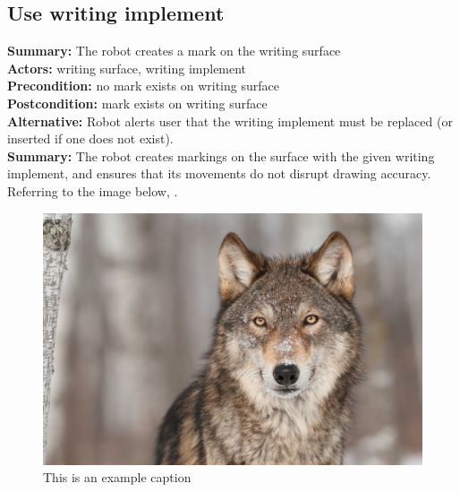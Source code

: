 \subsection{Use writing implement}
\textbf{Summary:} The robot creates a mark on the writing surface \\
\textbf{Actors:} writing surface, writing implement \\
\textbf{Precondition:} no mark exists on writing surface \\
\textbf{Postcondition:} mark exists on writing surface \\
\textbf{Alternative:} Robot alerts user that the writing implement must be replaced (or inserted if one does not exist). \\
\textbf{Summary:} The robot creates markings on the surface with the given writing implement, and ensures that its movements do not disrupt drawing accuracy. \\

Referring to the image below, .


\begin{figure}
 \centering
 \includegraphics[width=0.5\columnwidth]{figs/example_picture.jpg}
 \caption{This is an example caption}
 \label{fig:example_figure}
\end{figure}


